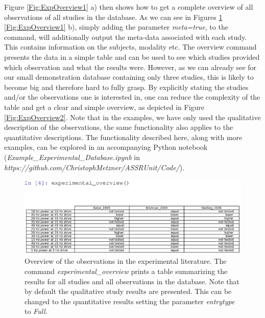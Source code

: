 \documentclass[a4paper,10pt]{article}
\begin{document}
Figure \ref{Fig:ExpOverview1} a) then shows how to get a complete overview of all observations of all studies in the database. As we can see in Figures \ref{Fig:ExpOverview0} \ref{Fig:ExpOverview1} b), simply adding the parameter \textit{meta=true},
to the command, will additionally output the meta-data associated with each study. This contains information on the subjects, modality etc.
The overview command presents the data in a simple table and can be used to see which studies provided 
which observation and what the results were. However, as we can already see for our small demonstration database containing only three studies, this is likely to become big and therefore hard to fully grasp.
By explicitly stating the studies and/or the observations one is interested in, one can reduce the complexity of the table and get a clear and simple overview, as depicted in Figure \ref{Fig:ExpOverview2}. Note that in the
examples, we have only used the qualitative description of the observations, the same functionality also applies to the quantitative descriptions. The functionality described here, along with
more examples, can be explored in an accompanying Python notebook (\textit{Example\_Experimental\_Database.ipynb} in \textit{https://github.com/ChristophMetzner/ASSRUnit/Code/}).


\begin{figure}
\includegraphics[width=\textwidth]{Figures/full_overview2}
\caption{Overview of the observations in the experimental literature.  The command \textit{experimental\_overview} prints a table summarizing the results for all studies and all observations in the database. 
 Note that by default the qualitative study results are presented. This can be changed to the quantitative results
setting the parameter \textit{entrytype} to \textit{Full}.}
\label{Fig:ExpOverview0}
\end{figure}
\end{document}
